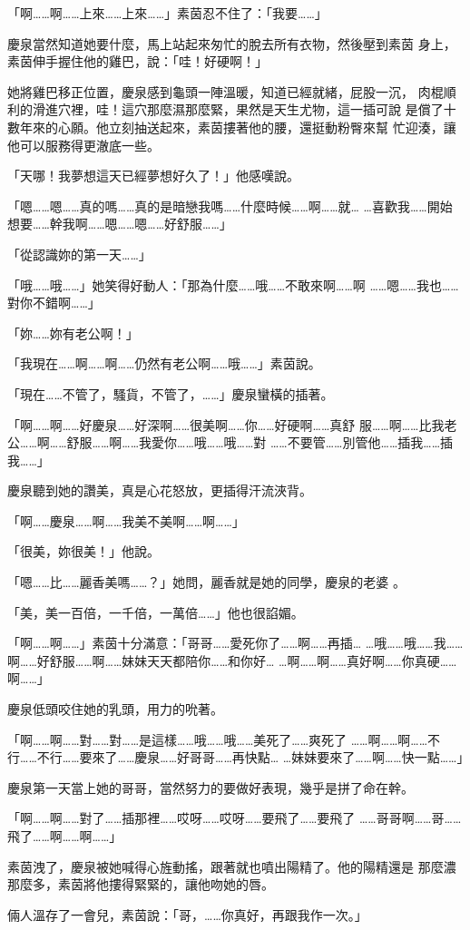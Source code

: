 「啊……啊……上來……上來……」素茵忍不住了：「我要……」

慶泉當然知道她要什麼，馬上站起來匆忙的脫去所有衣物，然後壓到素茵
身上，素茵伸手握住他的雞巴，說：「哇！好硬啊！」

她將雞巴移正位置，慶泉感到龜頭一陣溫暖，知道已經就緒，屁股一沉，
肉棍順利的滑進穴裡，哇！這穴那麼濕那麼緊，果然是天生尤物，這一插可說
是償了十數年來的心願。他立刻抽送起來，素茵摟著他的腰，還挺動粉臀來幫
忙迎湊，讓他可以服務得更澈底一些。

「天哪！我夢想這天已經夢想好久了！」他感嘆說。

「嗯……嗯……真的嗎……真的是暗戀我嗎……什麼時候……啊……就…
…喜歡我……開始想要……幹我啊……嗯……嗯……好舒服……」

「從認識妳的第一天……」

「哦……哦……」她笑得好動人：「那為什麼……哦……不敢來啊……啊
……嗯……我也……對你不錯啊……」

「妳……妳有老公啊！」

「我現在……啊……啊……仍然有老公啊……哦……」素茵說。

「現在……不管了，騷貨，不管了，……」慶泉蠻橫的插著。

「啊……啊……好慶泉……好深啊……很美啊……你……好硬啊……真舒
服……啊……比我老公……啊……舒服……啊……我愛你……哦……哦……對
……不要管……別管他……插我……插我……」

慶泉聽到她的讚美，真是心花怒放，更插得汗流浹背。

「啊……慶泉……啊……我美不美啊……啊……」

「很美，妳很美！」他說。

「嗯……比……麗香美嗎……？」她問，麗香就是她的同學，慶泉的老婆
。

「美，美一百倍，一千倍，一萬倍……」他也很諂媚。

「啊……啊……」素茵十分滿意：「哥哥……愛死你了……啊……再插…
…哦……哦……我……啊……好舒服……啊……妹妹天天都陪你……和你好…
…啊……啊……真好啊……你真硬……啊……」

慶泉低頭咬住她的乳頭，用力的吮著。

「啊……啊……對……對……是這樣……哦……哦……美死了……爽死了
……啊……啊……不行……不行……要來了……慶泉……好哥哥……再快點…
…妹妹要來了……啊……快一點……」

慶泉第一天當上她的哥哥，當然努力的要做好表現，幾乎是拼了命在幹。

「啊……啊……對了……插那裡……哎呀……哎呀……要飛了……要飛了
……哥哥啊……哥……飛了……啊……啊……」

素茵洩了，慶泉被她喊得心旌動搖，跟著就也噴出陽精了。他的陽精還是
那麼濃那麼多，素茵將他摟得緊緊的，讓他吻她的唇。

倆人溫存了一會兒，素茵說：「哥，……你真好，再跟我作一次。」

